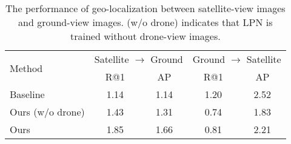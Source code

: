 \documentclass[journal]{IEEEtran}
\begin{document}
\setlength{\tabcolsep}{6pt}
\begin{table}
\small
\caption{The performance of geo-localization between satellite-view images and ground-view images. (w/o drone) indicates that LPN is trained without drone-view images.
}
\begin{center}
\begin{tabular}{l|cc|cc}
\hline
\multirow{2}{*}{Method}& \multicolumn{2}{c|}{Satellite $\rightarrow$ Ground} & \multicolumn{2}{c}{Ground $\rightarrow$ Satellite}\\
  & R@1 & AP & R@1 & AP\\
\shline
Baseline~\cite{zheng_university-1652_nodate} & 1.14 & 1.14 & 1.20 & 2.52\\
Ours (w/o drone) & 1.43 & 1.31 & 0.74 & 1.83 \\
Ours & 1.85 & 1.66 & 0.81 & 2.21 \\
\hline
\end{tabular}
\end{center}
\label{table:ground}
\end{table}
\end{document}
